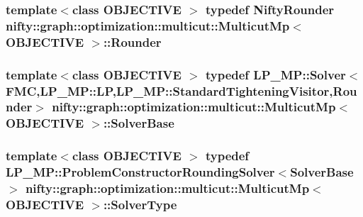 \subsubsection[{Rounder}]{\setlength{\rightskip}{0pt plus 5cm}template$<$class O\+B\+J\+E\+C\+T\+I\+V\+E $>$ typedef {\bf Nifty\+Rounder} {\bf nifty\+::graph\+::optimization\+::multicut\+::\+Multicut\+Mp}$<$ O\+B\+J\+E\+C\+T\+I\+V\+E $>$\+::{\bf Rounder}}\label{classnifty_1_1graph_1_1optimization_1_1multicut_1_1MulticutMp_a9f5b323f0e6ed2481e20fb12309b3451}
\hypertarget{classnifty_1_1graph_1_1optimization_1_1multicut_1_1MulticutMp_a8dbfef3a17fbb97d50db19cef1309e8a}{}
\subsubsection[{Solver\+Base}]{\setlength{\rightskip}{0pt plus 5cm}template$<$class O\+B\+J\+E\+C\+T\+I\+V\+E $>$ typedef L\+P\+\_\+\+M\+P\+::\+Solver$<${\bf F\+M\+C},L\+P\+\_\+\+M\+P\+::\+L\+P,L\+P\+\_\+\+M\+P\+::\+Standard\+Tightening\+Visitor,{\bf Rounder}$>$ {\bf nifty\+::graph\+::optimization\+::multicut\+::\+Multicut\+Mp}$<$ O\+B\+J\+E\+C\+T\+I\+V\+E $>$\+::{\bf Solver\+Base}}\label{classnifty_1_1graph_1_1optimization_1_1multicut_1_1MulticutMp_a8dbfef3a17fbb97d50db19cef1309e8a}
\hypertarget{classnifty_1_1graph_1_1optimization_1_1multicut_1_1MulticutMp_a9566cf8542059862763c8c936a032cb0}{}
\subsubsection[{Solver\+Type}]{\setlength{\rightskip}{0pt plus 5cm}template$<$class O\+B\+J\+E\+C\+T\+I\+V\+E $>$ typedef L\+P\+\_\+\+M\+P\+::\+Problem\+Constructor\+Rounding\+Solver$<${\bf Solver\+Base}$>$ {\bf nifty\+::graph\+::optimization\+::multicut\+::\+Multicut\+Mp}$<$ O\+B\+J\+E\+C\+T\+I\+V\+E $>$\+::{\bf Solver\+Type}}\label{classnifty_1_1graph_1_1optimization_1_1multicut_1_1MulticutMp_a9566cf8542059862763c8c936a032cb0}
\hypertarget{classnifty_1_1graph_1_1optimization_1_1multicut_1_1MulticutMp_ac0c55da1b0da06e56bc164f256e811e9}{}

